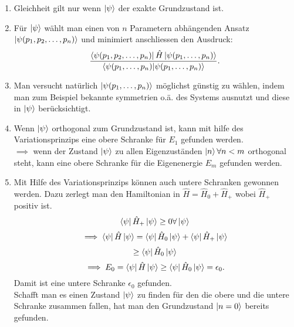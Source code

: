 \documentclass{report}
\begin{document}
\begin{enumerate}
	\item Gleichheit gilt nur wenn $\ket{\psi} $ der exakte Grundzustand ist.
	\item Für $\ket{\psi} $ wählt man einen von $n$ Parametern abhängenden Ansatz $\ket{\psi(p_1,p_2,\ldots,p_n)} $ und minimiert anschliessen den Ausdruck: \[
			\frac{\bra{\psi(p_1,p_2,\ldots,p_n)} \hat{H} \ket{\psi(p_1,\ldots, p_n)}}{\bra{\psi(p_1,\ldots,p_n)} \ket{\psi(p_1,\ldots,p_n)} } 
	.\] 
\item Man versucht natürlich $\ket{\psi(p_1,\ldots,p_n)} $ möglichst günstig zu wählen, indem man zum Beispiel bekannte symmetrien o.ä. des Systems ausnutzt und diese in $\ket{\psi} $ berücksichtigt.
	\item Wenn $\ket{\psi} $ orthogonal zum Grundzustand ist, kann mit hilfe des Variationsprinzips eine obere Schranke für $E_1$ gefunden werden. \\
		$\implies$ wenn der Zustand $\ket{\psi} $ zu allen Eigenzuständen $\ket{n} \forall n < m$ orthogonal steht, kann eine obere Schranke für die Eigenenergie $E_m$ gefunden werden.
	\item Mit Hilfe des Variationsprinzips können auch untere Schranken gewonnen werden. Dazu zerlegt man den Hamiltonian in $\hat{H} = \hat{H}_0 + \hat{H}_+$ wobei $\hat{H}_+$ positiv ist. \[
			\bra{\psi}\hat{H}_+ \ket{\psi} \ge 0 \forall \ket{\psi} \]
			\[
	\implies \bra{\psi} \hat{H} \ket{\psi} = \bra{\psi} \hat{H}_0 \ket{\psi} + \bra{\psi} \hat{H}_+ \ket{\psi}      
	\] \[
	\ge \bra{\psi} \hat{H}_0 \ket{\psi}  
	\] \[
	\implies E_0 = \bra{\psi} \hat{H} \ket{\psi} \ge \bra{\psi} \hat{H}_0 \ket{\psi} = \epsilon_0    
.\]  Damit ist eine untere Schranke $\epsilon_0$ gefunden.\\
Schafft man es einen Zustand $\ket{\psi} $ zu finden für den die obere und die untere Schranke zusammen fallen, hat man den Grundzustand $\ket{n = 0} $ bereits gefunden.
\end{enumerate}
\end{document}
